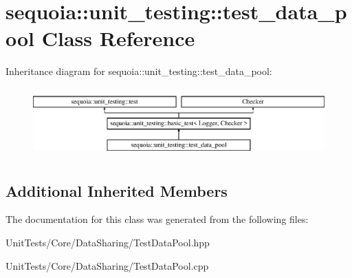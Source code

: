 \hypertarget{classsequoia_1_1unit__testing_1_1test__data__pool}{}\section{sequoia\+::unit\+\_\+testing\+::test\+\_\+data\+\_\+pool Class Reference}
\label{classsequoia_1_1unit__testing_1_1test__data__pool}
Inheritance diagram for sequoia\+::unit\+\_\+testing\+::test\+\_\+data\+\_\+pool\+:\begin{figure}[H]
\begin{center}
\leavevmode
\includegraphics[height=2.666667cm]{classsequoia_1_1unit__testing_1_1test__data__pool}
\end{center}
\end{figure}
\subsection*{Additional Inherited Members}


The documentation for this class was generated from the following files\+:\begin{DoxyCompactItemize}
\item 
Unit\+Tests/\+Core/\+Data\+Sharing/Test\+Data\+Pool.\+hpp\item 
Unit\+Tests/\+Core/\+Data\+Sharing/Test\+Data\+Pool.\+cpp\end{DoxyCompactItemize}
